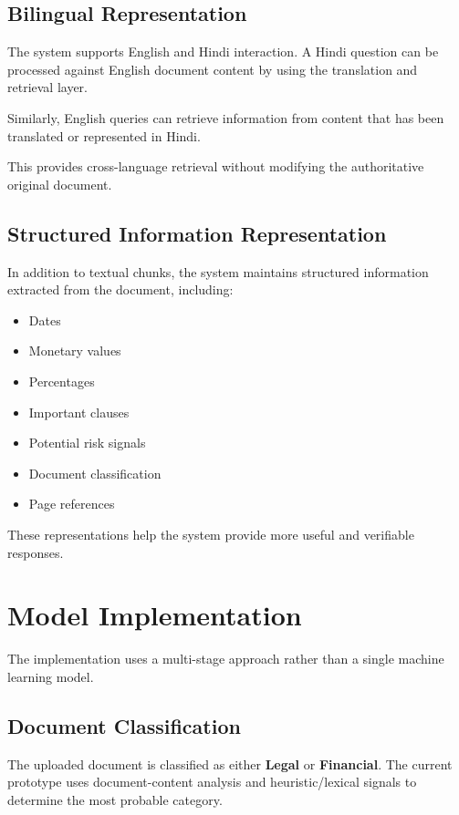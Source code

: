 \subsection{Bilingual Representation}

The system supports English and Hindi interaction. A Hindi question
can be processed against English document content by using the
translation and retrieval layer.

Similarly, English queries can retrieve information from content that
has been translated or represented in Hindi.

This provides cross-language retrieval without modifying the
authoritative original document.

\subsection{Structured Information Representation}

In addition to textual chunks, the system maintains structured
information extracted from the document, including:

\begin{itemize}
    \item Dates
    \item Monetary values
    \item Percentages
    \item Important clauses
    \item Potential risk signals
    \item Document classification
    \item Page references
\end{itemize}

These representations help the system provide more useful and
verifiable responses.

\section{Model Implementation}

The implementation uses a multi-stage approach rather than a single
machine learning model.

\subsection{Document Classification}

The uploaded document is classified as either \textbf{Legal} or
\textbf{Financial}. The current prototype uses document-content
analysis and heuristic/lexical signals to determine the most probable
category.

